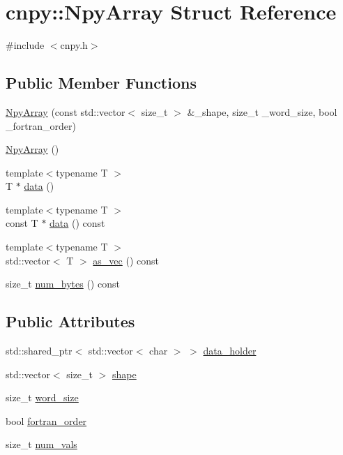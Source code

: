 \hypertarget{structcnpy_1_1_npy_array}{}\section{cnpy\+:\+:Npy\+Array Struct Reference}
\label{structcnpy_1_1_npy_array}


{\ttfamily \#include $<$cnpy.\+h$>$}

\subsection*{Public Member Functions}
\begin{DoxyCompactItemize}
\item 
\hyperlink{structcnpy_1_1_npy_array_a9660f15110b46ee3384505cb7819531c}{Npy\+Array} (const std\+::vector$<$ size\+\_\+t $>$ \&\+\_\+shape, size\+\_\+t \+\_\+word\+\_\+size, bool \+\_\+fortran\+\_\+order)
\item 
\hyperlink{structcnpy_1_1_npy_array_a22a4c264b18f3411bf739d91ffb4389f}{Npy\+Array} ()
\item 
{\footnotesize template$<$typename T $>$ }\\T $\ast$ \hyperlink{structcnpy_1_1_npy_array_a367b7feaf166b62930cc6ce1c4426fc4}{data} ()
\item 
{\footnotesize template$<$typename T $>$ }\\const T $\ast$ \hyperlink{structcnpy_1_1_npy_array_a1622cd2863fb3f238c2b777a74d5a4e2}{data} () const
\item 
{\footnotesize template$<$typename T $>$ }\\std\+::vector$<$ T $>$ \hyperlink{structcnpy_1_1_npy_array_a4cf626dc18eec8b40fabd499253a069c}{as\+\_\+vec} () const
\item 
size\+\_\+t \hyperlink{structcnpy_1_1_npy_array_ae8004f74b07e6148d7342c2d063e12fc}{num\+\_\+bytes} () const
\end{DoxyCompactItemize}
\subsection*{Public Attributes}
\begin{DoxyCompactItemize}
\item 
std\+::shared\+\_\+ptr$<$ std\+::vector$<$ char $>$ $>$ \hyperlink{structcnpy_1_1_npy_array_a274276ea92cf0839ee14a292f4d0dc2f}{data\+\_\+holder}
\item 
std\+::vector$<$ size\+\_\+t $>$ \hyperlink{structcnpy_1_1_npy_array_a60dc8f8953d4b90d5a71a2af42f8de83}{shape}
\item 
size\+\_\+t \hyperlink{structcnpy_1_1_npy_array_ada76e18467c2e3d2c3100fdde6dce358}{word\+\_\+size}
\item 
bool \hyperlink{structcnpy_1_1_npy_array_a073fe36f66efb1ef9229dafeac1c43c2}{fortran\+\_\+order}
\item 
size\+\_\+t \hyperlink{structcnpy_1_1_npy_array_a8eba9ba1c8987d9364312b579f3444b8}{num\+\_\+vals}
\end{DoxyCompactItemize}



